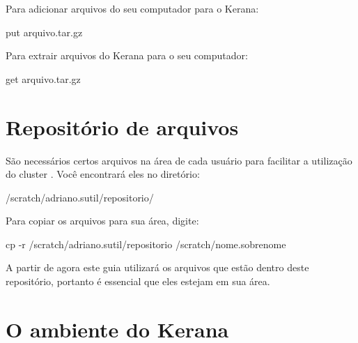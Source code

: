 \noindent Para adicionar arquivos do seu computador para o Kerana:
\bigskip

\begin{bashcode}
put arquivo.tar.gz
\end{bashcode}
\bigskip

\noindent Para extrair arquivos do Kerana para o seu computador:
\bigskip

\begin{bashcode}
get arquivo.tar.gz
\end{bashcode}
\bigskip

\section{Repositório de arquivos}\label{reposit}
\bigskip

\noindent São necessários certos arquivos na área de cada usuário para facilitar a utilização do cluster . Você encontrará eles no diretório:
\bigskip

\begin{bashcode}
/scratch/adriano.sutil/repositorio/
\end{bashcode}
\bigskip

\noindent Para copiar os arquivos para sua área, digite:
\bigskip

\begin{bashcode}
cp -r /scratch/adriano.sutil/repositorio /scratch/nome.sobrenome
\end{bashcode}
\bigskip

\begin{tcolorbox}[enhanced,
  grow to left by   = 0cm,
  grow to right by  = 0cm,
  enlarge top by    = 0cm,
  enlarge bottom by = 0cm,
  tcbox raise base,
  boxrule           = 1.0pt,
  left              = 18mm,
  colframe          = red!50!black,coltext=red!25!black,colback=red!10!white,
  overlay           = {\begin{tcbclipinterior}\fill[red!75!blue!50!white] (frame.south west)
    rectangle node[text=white,font=\sffamily\bfseries\footnotesize,rotate=0] {ATENÇÃO} ([xshift=18mm]frame.north west);\end{tcbclipinterior}}]
A partir de agora este guia utilizará os arquivos que estão dentro deste repositório, portanto é essencial que eles estejam em sua área.
\end{tcolorbox}
\bigskip

\section{O ambiente do Kerana}
\bigskip

